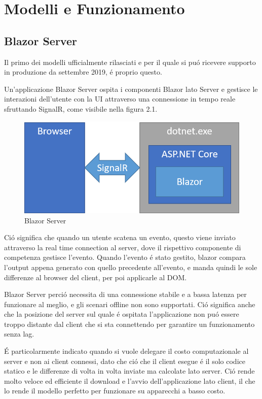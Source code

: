 \chapter{Modelli e Funzionamento}\label{cap:modefunz}
\section{Blazor Server}\label{sez:bserver}
Il primo dei modelli ufficialmente rilasciati e per il quale si pu\'o ricevere supporto in produzione da settembre 2019\cite{blazorServerRelease}, \'e proprio questo.

Un'applicazione Blazor Server ospita i componenti Blazor lato Server e gestisce le interazioni dell'utente con la UI attraverso una connessione in tempo reale sfruttando SignalR, come visibile nella figura 2.1.

\begin{figure}[H]
	\centerline{\includegraphics[scale=0.6]{figure/blazor-server.png}}
	\caption{Blazor Server}
	\label{fig:BlazorServer}
\end{figure}

Ci\'o significa che quando un utente scatena un evento, questo viene inviato attraverso la real time connection al server, dove il rispettivo componente di competenza gestisce l'evento.
Quando l'evento \'e stato gestito, blazor compara l'output appena generato con quello precedente all'evento, e manda quindi le sole differenze al browser del client, per poi applicarle al DOM.\cite{blazorModelsScenarios}

Blazor Server perci\'o necessita di una connessione stabile e a bassa latenza per funzionare al meglio, e gli scenari offline non sono supportati.
Ci\'o significa anche che la posizione del server sul quale \'e ospitata l'applicazione non pu\'o essere troppo distante dal client che si sta connettendo per garantire un funzionamento senza lag.

\'E particolarmente indicato quando si vuole delegare il costo computazionale al server e non ai client connessi, dato che ci\'o che il client esegue \'e il solo codice statico e le differenze di volta in volta inviate ma calcolate lato server.
Ci\'o rende molto veloce ed efficiente il download e l'avvio dell'applicazione lato client, il che lo rende il modello perfetto per funzionare su apparecchi a basso costo.

